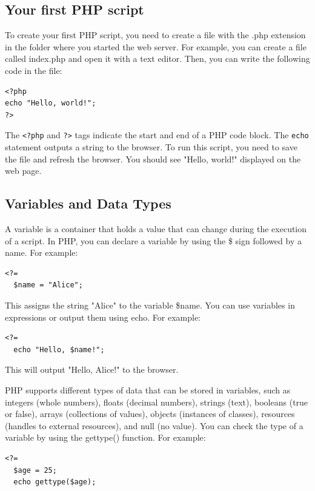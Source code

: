 \documentclass[11pt]{article}
\begin{document}
\subsection{Your first PHP script}
\label{sec:orgf14ac4c}
To create your first PHP script, you need to create a file with the .php
extension in the folder where you started the web server. For example,
you can create a file called index.php and open it with a text editor.
Then, you can write the following code in the file:

\begin{verbatim}
<?php
echo "Hello, world!";
?>
\end{verbatim}

The \texttt{<?php} and \texttt{?>} tags indicate the start and end of a PHP code
block. The \texttt{echo} statement outputs a string to the browser. To run this
script, you need to save the file and refresh the browser. You should
see "Hello, world!"  displayed on the web page.

\subsection{Variables and Data Types}
\label{sec:orgce6c1df}
A variable is a container that holds a value that can change during the
execution of a script. In PHP, you can declare a variable by using the \$
sign followed by a name. For example:

\begin{verbatim}
<?=
  $name = "Alice";
\end{verbatim}

This assigns the string "Alice" to the variable \$name. You can use
variables in expressions or output them using echo. For example:

\begin{verbatim}
<?=
  echo "Hello, $name!";
\end{verbatim}

This will output "Hello, Alice!" to the browser.

PHP supports different types of data that can be stored in variables,
such as integers (whole numbers), floats (decimal numbers), strings
(text), booleans (true or false), arrays (collections of values),
objects (instances of classes), resources (handles to external
resources), and null (no value). You can check the type of a variable by
using the gettype() function. For example:

\begin{verbatim}
<?=
  $age = 25;
  echo gettype($age);
\end{verbatim}
\end{document}
